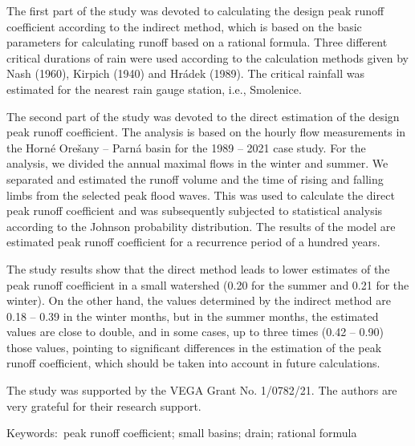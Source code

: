 The first part of the study was devoted to calculating the design peak runoff coefficient according to the indirect method, which is based on the basic parameters for calculating runoff based on a rational formula. Three different critical durations of rain were used according to the calculation methods given by Nash (1960), Kirpich (1940) and Hrádek (1989). The critical rainfall was estimated for the nearest rain gauge station, i.e., Smolenice.

The second part of the study was devoted to the direct estimation of the design peak runoff coefficient. The analysis is based on the hourly flow measurements in the Horné Orešany – Parná basin for the 1989 – 2021 case study. For the analysis, we divided the annual maximal flows in the winter and summer. We separated and estimated the runoff volume and the time of rising and falling limbs from the selected peak flood waves. This was used to calculate the direct peak runoff coefficient and was subsequently subjected to statistical analysis according to the Johnson probability distribution. The results of the model are estimated peak runoff coefficient for a recurrence period of a hundred years.

The study results show that the direct method leads to lower estimates of the peak runoff coefficient in a small watershed (0.20 for the summer and 0.21 for the winter). On the other hand, the values determined by the indirect method are 0.18 – 0.39 in the winter months, but in the summer months, the estimated values are close to double, and in some cases, up to three times (0.42 – 0.90) those values, pointing to significant differences in the estimation of the peak runoff coefficient, which should be taken into account in future calculations.

The study was supported by the VEGA Grant No. 1/0782/21. The authors are very grateful for their research support.

Keywords: peak runoff coefficient; small basins; drain; rational formula



\newpage{}
{}
\begin{flushleft}






\end{flushleft}

